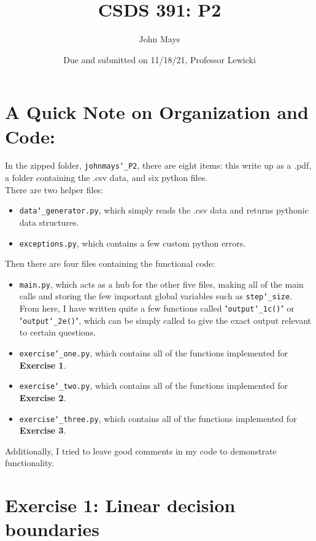 \documentclass{article} %
\title{\textbf{CSDS 391: P2}}
\author{John Mays}
\date{Due and submitted on 11/18/21, Professor Lewicki}
\newcommand{\us}{\char`_}
\begin{document}
\maketitle

\section*{A Quick Note on Organization and Code:}
In the zipped folder, \texttt{johnmays\us P2}, there are eight items: this write up as a .pdf, a folder containing the .csv data, and six python files.\\
There are two helper files:
\begin{itemize}
    \item \texttt{data\us generator.py}, which simply reads the .csv data and returns pythonic data structures.
    \item \texttt{exceptions.py}, which contains a few custom python errors.
\end{itemize}
Then there are four files containing the functional code:
\begin{itemize}
    \item \texttt{main.py}, which acts as a hub for the other five files, making all of the main calls and storing the few important global variables such as \texttt{step\us size}.  From here, I have written quite a few functions called "\texttt{output\us 1c()}" or "\texttt{output\us 2e()}", which can be simply called to give the exact output relevant to certain questions.
    \item \texttt{exercise\us one.py}, which contains all of the functions implemented for \textbf{Exercise 1}.
    \item \texttt{exercise\us two.py}, which contains all of the functions implemented for \textbf{Exercise 2}.
    \item \texttt{exercise\us three.py}, which contains all of the functions implemented for \textbf{Exercise 3}.
\end{itemize}
Additionally, I tried to leave good comments in my code to demonstrate functionality.

\section*{Exercise 1: Linear decision boundaries}
\end{document}
